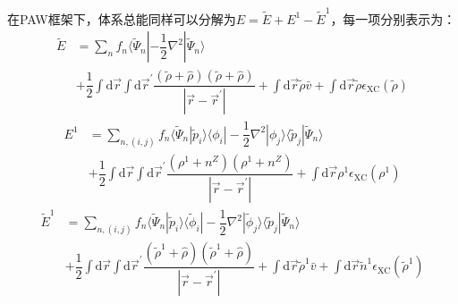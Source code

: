 {%
在\textrm{PAW}框架下，体系总能同样可以分解为$E=\tilde E+E^1-\tilde E^1$，每一项分别表示为：
\begin{equation}
	\begin{aligned}
		\tilde E&=\sum_nf_n\langle\tilde\Psi_n|-\dfrac12\nabla^2|\tilde\Psi_n\rangle\\
		&+\dfrac12\int\mathrm{d}\vec r\int\mathrm{d}\vec r^{\prime}\dfrac{(\tilde\rho+\hat\rho)(\tilde\rho+\hat\rho)}{|\vec r-\vec r^{\prime}|}+\int\mathrm{d}\vec r \tilde\rho\bar v+\int\mathrm{d}\vec r \tilde\rho\epsilon_{\mathrm{XC}}(\tilde\rho)
 	\end{aligned}
	\label{eq:PAW-Blochl-09}
\end{equation}
\begin{equation}
	\begin{aligned}
		E^1&=\sum_{n,(i,j)}f_n\langle\tilde\Psi_n|\tilde p_i\rangle\langle\phi_i|-\dfrac12\nabla^2|\phi_j\rangle\langle\tilde p_j|\tilde\Psi_n\rangle\\
		 &+\dfrac12\int\mathrm{d}\vec r\int\mathrm{d}\vec r^{\prime}\dfrac{(\rho^1+n^Z)(\rho^1+n^Z)}{|\vec r-\vec r^{\prime}|}+\int\mathrm{d}\vec r\rho^1\epsilon_{\mathrm{XC}}(\rho^1)
 	\end{aligned}
	\label{eq:PAW-Blochl-10}
\end{equation}
\begin{equation}
	\begin{aligned}
		\tilde E^1&=\sum_{n,(i,j)}f_n\langle\tilde\Psi_n|\tilde p_i\rangle\langle\tilde\phi_i|-\dfrac12\nabla^2|\tilde\phi_j\rangle\langle\tilde p_j|\tilde\Psi_n\rangle\\
		 &+\dfrac12\int\mathrm{d}\vec r\int\mathrm{d}\vec r^{\prime}\dfrac{(\tilde\rho^1+\hat\rho)(\tilde\rho^1+\hat\rho)}{|\vec r-\vec r^{\prime}|}+\int\mathrm{d}\vec r \tilde\rho^1\bar v+\int\mathrm{d}\vec r \tilde n^1\epsilon_{\mathrm{XC}}(\tilde\rho^1)
 	\end{aligned} 
	\label{eq:PAW-Blochl-11}
\end{equation}
}

